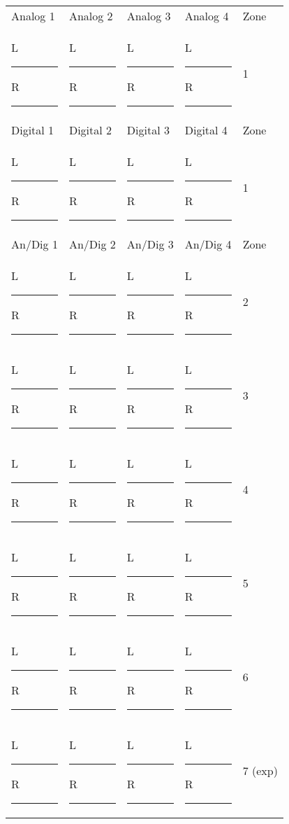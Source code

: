 \documentclass{article}
\begin{document}
\begin{minipage}[t]{0.52\textwidth}
  {\renewcommand{\arraystretch}{1.5} %
  \begin{tabularx}{\linewidth}{XXXXX}
    Analog 1 & Analog 2 & Analog 3 & Analog 4 & Zone \\
    L \rule{1.2em}{0.4pt} R \rule{1.2em}{0.4pt} & L \rule{1.2em}{0.4pt} R \rule{1.2em}{0.4pt} &
      L \rule{1.2em}{0.4pt} R \rule{1.2em}{0.4pt} & L \rule{1.2em}{0.4pt} R \rule{1.2em}{0.4pt} & 1 \\
    Digital 1 & Digital 2 & Digital 3 & Digital 4 & Zone \\
    L \rule{1.2em}{0.4pt} R \rule{1.2em}{0.4pt} & L \rule{1.2em}{0.4pt} R \rule{1.2em}{0.4pt} &
      L \rule{1.2em}{0.4pt} R \rule{1.2em}{0.4pt} & L \rule{1.2em}{0.4pt} R \rule{1.2em}{0.4pt} & 1 \\
    An/Dig 1 & An/Dig 2 & An/Dig 3 & An/Dig 4 & Zone \\
    L \rule{1.2em}{0.4pt} R \rule{1.2em}{0.4pt} & L \rule{1.2em}{0.4pt} R \rule{1.2em}{0.4pt} &
      L \rule{1.2em}{0.4pt} R \rule{1.2em}{0.4pt} & L \rule{1.2em}{0.4pt} R \rule{1.2em}{0.4pt} & 2 \\
    L \rule{1.2em}{0.4pt} R \rule{1.2em}{0.4pt} & L \rule{1.2em}{0.4pt} R \rule{1.2em}{0.4pt} &
      L \rule{1.2em}{0.4pt} R \rule{1.2em}{0.4pt} & L \rule{1.2em}{0.4pt} R \rule{1.2em}{0.4pt} & 3 \\
    L \rule{1.2em}{0.4pt} R \rule{1.2em}{0.4pt} & L \rule{1.2em}{0.4pt} R \rule{1.2em}{0.4pt} &
      L \rule{1.2em}{0.4pt} R \rule{1.2em}{0.4pt} & L \rule{1.2em}{0.4pt} R \rule{1.2em}{0.4pt} & 4 \\
    L \rule{1.2em}{0.4pt} R \rule{1.2em}{0.4pt} & L \rule{1.2em}{0.4pt} R \rule{1.2em}{0.4pt} &
      L \rule{1.2em}{0.4pt} R \rule{1.2em}{0.4pt} & L \rule{1.2em}{0.4pt} R \rule{1.2em}{0.4pt} & 5 \\
    L \rule{1.2em}{0.4pt} R \rule{1.2em}{0.4pt} & L \rule{1.2em}{0.4pt} R \rule{1.2em}{0.4pt} &
      L \rule{1.2em}{0.4pt} R \rule{1.2em}{0.4pt} & L \rule{1.2em}{0.4pt} R \rule{1.2em}{0.4pt} & 6 \\
    L \rule{1.2em}{0.4pt} R \rule{1.2em}{0.4pt} & L \rule{1.2em}{0.4pt} R \rule{1.2em}{0.4pt} &
      L \rule{1.2em}{0.4pt} R \rule{1.2em}{0.4pt} & L \rule{1.2em}{0.4pt} R \rule{1.2em}{0.4pt} & 7 (exp) \\
  \end{tabularx}}
\end{minipage}
\end{document}
